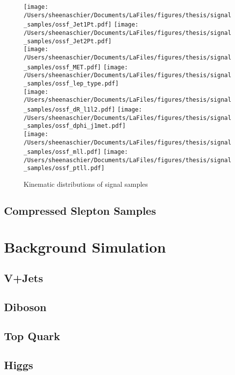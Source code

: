    \begin{figure}[tbp]
 \texttt{[image: /Users/sheenaschier/Documents/LaFiles/figures/thesis/signal\_samples/ossf\_Jet1Pt.pdf]}
\texttt{[image: /Users/sheenaschier/Documents/LaFiles/figures/thesis/signal\_samples/ossf\_Jet2Pt.pdf]}\\
\texttt{[image: /Users/sheenaschier/Documents/LaFiles/figures/thesis/signal\_samples/ossf\_MET.pdf]}
\texttt{[image: /Users/sheenaschier/Documents/LaFiles/figures/thesis/signal\_samples/ossf\_lep\_type.pdf]}\\
 \texttt{[image: /Users/sheenaschier/Documents/LaFiles/figures/thesis/signal\_samples/ossf\_dR\_l1l2.pdf]}
 \texttt{[image: /Users/sheenaschier/Documents/LaFiles/figures/thesis/signal\_samples/ossf\_dphi\_j1met.pdf]}\\
 \texttt{[image: /Users/sheenaschier/Documents/LaFiles/figures/thesis/signal\_samples/ossf\_mll.pdf]}
 \texttt{[image: /Users/sheenaschier/Documents/LaFiles/figures/thesis/signal\_samples/ossf\_ptll.pdf]}\\
   \caption{Kinematic distributions of signal samples}
   \label{fig:SigSample2}
 \end{figure}

\subsection{Compressed Slepton Samples}

 \FloatBarrier
 
 \section{Background Simulation}
 \subsection{V+Jets}
 \subsection{Diboson}
 \subsection{Top Quark}
 \subsection{Higgs}


